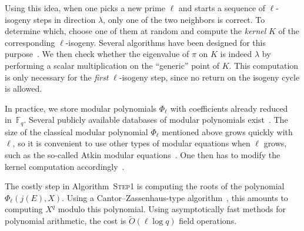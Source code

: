 \documentclass{article}
\newcommand{\F}{\mathbb{F}}
\newcommand{\softO}{\tilde{O}}
\newcommand{\algstyle}[1]{\textsc{#1}}
\theoremstyle{definition}
\begin{document}
Using this idea, when one picks a new prime $\ell$ and starts a sequence
of $\ell$-isogeny steps in direction $\lambda$, 
only one of the two neighbors is
correct. To determine which, choose one of them at random and
compute the \emph{kernel} $K$ of the corresponding $\ell$-isogeny. Several
algorithms have been designed for this purpose~\cite{todo:isogkernel}.
We then check whether the eigenvalue of $\pi$ on $K$ is indeed $\lambda$
by performing a scalar multiplication on the ``generic'' point of $K$.
This computation is only necessary for the \emph{first} $\ell$-isogeny
step, since no return on the isogeny cycle is allowed.

In practice, we store modular polynomials $\Phi_\ell$
with coefficients already reduced in~$\F_q$. 
Several publicly available databases of modular polynomials
exist~\cite{todo:modulardatabases}. The size of the classical modular polynomial
$\Phi_\ell$ mentioned above grows quickly with $\ell$, so it is convenient
to use other types of modular equations when $\ell$ grows, such as the so-called
Atkin modular equations~\cite{todo:atkinmodpoly}. One then has to
modify the kernel computation accordingly~\cite{todo:isogkernelatkin}.

The costly step in Algorithm~\algstyle{Step1} is computing the roots
of the polynomial $\Phi_\ell(j(E), X)$. Using a Cantor--Zassenhaus-type
algorithm~\cite{todo:canzass}, this amounts to computing $X^q$ modulo
this polynomial. Using asymptotically fast methods for polynomial
arithmetic, the cost is $\softO(\ell\log q)$ field operations.
\end{document}
